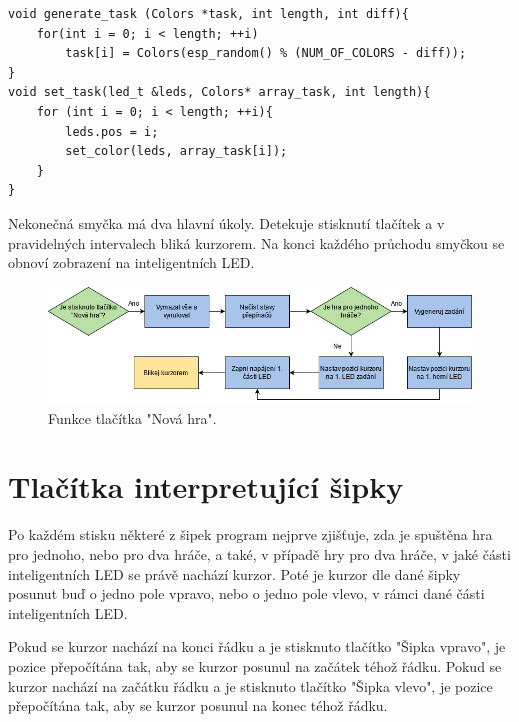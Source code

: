 \begin{minipage}{\linewidth}
\begin{lstlisting}[frame=single,numbers=right,caption={Funkce pro vygenerování zadání.},label=lst:priklad.vypis.kodu.C,basicstyle=\ttfamily\small, keywordstyle=\color{black}\bfseries\underbar,]
void generate_task (Colors *task, int length, int diff){
    for(int i = 0; i < length; ++i)
        task[i] = Colors(esp_random() % (NUM_OF_COLORS - diff));
}     
void set_task(led_t &leds, Colors* array_task, int length){
    for (int i = 0; i < length; ++i){
        leds.pos = i;
        set_color(leds, array_task[i]); 
    } 
}   
\end{lstlisting}
\end{minipage} 

Nekonečná smyčka má dva hlavní úkoly. Detekuje stisknutí tlačítek a v pravidelných intervalech bliká kurzorem. Na konci každého průchodu smyčkou 
se obnoví zobrazení na inteligentních LED.

  \begin{figure}[!h]
    \begin{center}
      \includegraphics[scale=0.5]{obrazky/Nova_hra.png}
    \end{center}
    \caption[Funkce tlačítka Nová hra]{Funkce tlačítka "Nová hra".}
  \end{figure}

\section{Tlačítka interpretující šipky}
Po každém stisku některé z šipek program nejprve zjišťuje, zda je spuštěna hra pro jednoho, nebo pro dva hráče, a také, v případě hry pro dva
hráče, v jaké části inteligentních LED se právě nachází kurzor. Poté je kurzor dle dané šipky posunut buď o jedno pole vpravo, nebo o jedno 
pole vlevo, v rámci dané části inteligentních LED. 

Pokud se kurzor nachází na konci řádku a je stisknuto tlačítko "Šipka vpravo", je pozice přepočítána tak, aby se kurzor posunul na 
začátek téhož řádku. Pokud se kurzor nachází na začátku řádku a je stisknuto tlačítko "Šipka vlevo", je pozice přepočítána tak, aby se kurzor 
posunul na konec téhož řádku. 

